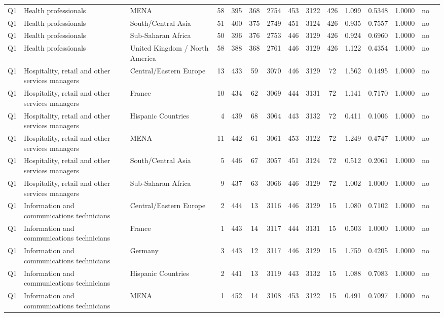 \begin{longtable}{lllrcccccccccll}
Q1 & Health professionals & MENA & 58 & 395 & 368 & 2754 & 453 & 3122 & 426 & 1.099 & 0.5348 & 1.0000 & no \\
Q1 & Health professionals & South/Central Asia & 51 & 400 & 375 & 2749 & 451 & 3124 & 426 & 0.935 & 0.7557 & 1.0000 & no \\
Q1 & Health professionals & Sub-Saharan Africa & 50 & 396 & 376 & 2753 & 446 & 3129 & 426 & 0.924 & 0.6960 & 1.0000 & no \\
Q1 & Health professionals & United Kingdom / North America & 58 & 388 & 368 & 2761 & 446 & 3129 & 426 & 1.122 & 0.4354 & 1.0000 & no \\
Q1 & Hospitality, retail and other services managers & Central/Eastern Europe & 13 & 433 & 59 & 3070 & 446 & 3129 & 72 & 1.562 & 0.1495 & 1.0000 & no \\
Q1 & Hospitality, retail and other services managers & France & 10 & 434 & 62 & 3069 & 444 & 3131 & 72 & 1.141 & 0.7170 & 1.0000 & no \\
Q1 & Hospitality, retail and other services managers & Hispanic Countries & 4 & 439 & 68 & 3064 & 443 & 3132 & 72 & 0.411 & 0.1006 & 1.0000 & no \\
Q1 & Hospitality, retail and other services managers & MENA & 11 & 442 & 61 & 3061 & 453 & 3122 & 72 & 1.249 & 0.4747 & 1.0000 & no \\
Q1 & Hospitality, retail and other services managers & South/Central Asia & 5 & 446 & 67 & 3057 & 451 & 3124 & 72 & 0.512 & 0.2061 & 1.0000 & no \\
Q1 & Hospitality, retail and other services managers & Sub-Saharan Africa & 9 & 437 & 63 & 3066 & 446 & 3129 & 72 & 1.002 & 1.0000 & 1.0000 & no \\
Q1 & Information and communications technicians & Central/Eastern Europe & 2 & 444 & 13 & 3116 & 446 & 3129 & 15 & 1.080 & 0.7102 & 1.0000 & no \\
Q1 & Information and communications technicians & France & 1 & 443 & 14 & 3117 & 444 & 3131 & 15 & 0.503 & 1.0000 & 1.0000 & no \\
Q1 & Information and communications technicians & Germany & 3 & 443 & 12 & 3117 & 446 & 3129 & 15 & 1.759 & 0.4205 & 1.0000 & no \\
Q1 & Information and communications technicians & Hispanic Countries & 2 & 441 & 13 & 3119 & 443 & 3132 & 15 & 1.088 & 0.7083 & 1.0000 & no \\
Q1 & Information and communications technicians & MENA & 1 & 452 & 14 & 3108 & 453 & 3122 & 15 & 0.491 & 0.7097 & 1.0000 & no \\

\end{longtable}
